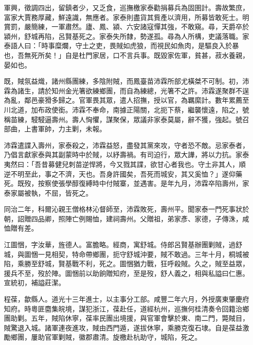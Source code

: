 \begin{pinyinscope}
軍興，徵調四出，留鎮者少，又乏食，巡撫檄家泰勸捐募兵為固圉計。壽故繁庶，富家大賈務厚藏，鮮遠識，無應者。家泰則盡貨其貲產以濟用，所募皆敢死士。明賞罰，嚴簡練，一軍肅然。廬、鳳、潁、六安諸寇憚其強，不敢窺。尋，天爵卒於潁州，舒城再陷，呂賢基死之。家泰失所隸，勢遂孤。尋為人所構，吏議落職。家泰語人曰：「時事糜爛，守土之吏，畏賊如虎狼，而視民如魚肉，是驅良入於暴也，吾無死所矣！」自是杜門家居，口不言兵事。既毀家佐軍，貧甚，菽水養親，晏如也。

既，賊氛益熾，諸州縣團練，多陰附賊，而鳳臺苗沛霖所部尤橫桀不可制。初，沛霖為諸生，請於知州金光箸欲練鄉團，而自為練總，光箸不之許。沛霖遂聚群不逞為亂，鄰邑豪猾多歸之。官軍畏其眾，遣人招撫，授以官，為羈縻計。數年累薦至川北道，加布政使銜。沛霖不奉命，南據正陽關，北扼下蔡，繼襲懷遠，陷之，號稱苗練，駸駸逼壽州。壽人恟懼，謀聚保，眾議非家泰莫屬，辭不獲，強起。號召部曲，上書軍帥，力主剿，未報。

沛霖遣諜入壽州，家泰殺之，沛霖益怒，盡發其黨來攻，守者恐不敵。忌家泰者，乃倡言獻家泰與其副蒙時中於賊，以紓壽禍。有司迫行，眾大譁，將以力抗。家泰夷然曰：「吾昔募健兒刺苗逆悍將，今又戮其諜，欲甘心者我也。守土非其人，順逆不明至此，事之不濟，天也。吾身許國矣，吾死而城安，其又奚恤？」遂仰藥死。既歿，按察使張學醇復縛時中付賊寨，並遇害。是年九月，沛霖卒陷壽州，家泰家屬被執，不屈，皆死之。

同治二年，科爾沁親王僧格林沁督師至，沛霖敗死，壽州平。聞家泰一門死事狀於朝，詔贈四品卿，照陣亡例賜恤，建祠壽州。父贈祖，弟家彥、家德，子傳洙，咸恤贈有差。

江圖悃，字汝華，旌德人。富膽略。經商，寓舒城。侍郎呂賢基辦團剿賊，過舒城，與圖悃一見相契，特命帶鄉團，扼守舒城沖要，賊不敢過。三年十月，桐城被陷，乘勝至舒城，賢基戰不利，死之。圖悃猶力戰，狂呼殺賊。久之，賊至益眾，援兵不至，歿於陣。圖悃前以助餉贈知府，至是歿，舒人義之，相與私謚曰仁惠。宣統初，補謚莊潔。

程葆，歙縣人。道光十三年進士，以主事分工部。咸豐二年六月，外授廣東肇慶府知府。時粵匪麕集皖境，謀犯浙江，葆赴任，道經杭州，巡撫何桂清奏令回籍治鄉團助剿。五年，賊陷休寧，葆率民團出境援，與官軍會擊於東、南二門，斃賊目，賊驚退入城。諸軍連夜進攻，賊由西門遁，遂拔休寧，乘勝克復石埭。自是葆益激勵鄉團，屢助官軍剿賊，徽郡肅清。旋檄赴杭助守，城陷，死之。


\end{pinyinscope}

